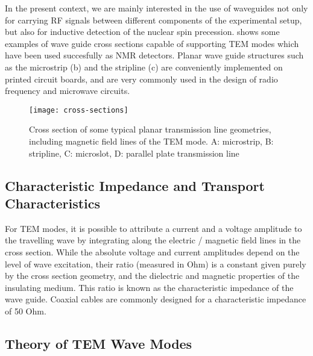In the present context, we are mainly interested in the use of waveguides not only 
for carrying RF signals between different components of the experimental setup,
 but also for inductive detection of the nuclear  spin precession. 
shows some examples of wave guide cross sections capable of supporting
TEM modes which have been used succesfully as NMR detectors. 
Planar wave guide structures such as the microstrip (b) and the
stripline (c) are conveniently implemented on printed circuit
boards, \cite{Barret:1955ie} and are very commonly used in the design of
radio frequency and microwave circuits. 


\begin{figure}
	\begin{center}
		\texttt{[image: cross-sections]}
	\end{center}
	\caption{Cross section of some typical planar transmission line geometries,
  		including magnetic field lines of the TEM mode. A: microstrip, B: stripline, C: microslot, D: parallel plate transmission line}
	\label{fig:cross-sections}
\end{figure}

\subsection{Characteristic Impedance and Transport
Characteristics}\label{characteristic-impedance-and-transport-characteristics}

For TEM modes, it is possible to attribute a current and a voltage
amplitude to the travelling wave by integrating along the electric /
magnetic field lines in the cross section. While the absolute voltage
and current amplitudes depend on the level of wave excitation, their
ratio (measured in Ohm) is a constant given purely by the cross section
geometry, and the dielectric and magnetic properties of the insulating
medium. This ratio is known as the characteristic impedance  of
the wave guide. Coaxial cables are commonly designed for a
characteristic impedance of 50 Ohm.

\subsection{Theory of TEM Wave Modes}\label{theory-of-tem-wave-modes}

